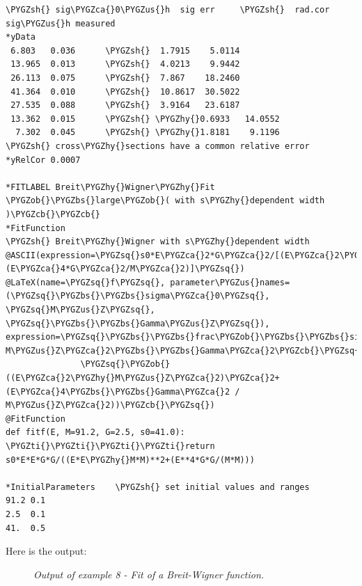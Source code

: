 \documentclass[a4paper,10pt,english]{sphinxmanual}
\def\PYGZbs{\char`\\}
\def\PYGZus{\char`\_}
\def\PYGZob{\char`\{}
\def\PYGZcb{\char`\}}
\def\PYGZca{\char`\^}
\def\PYGZsh{\char`\#}
\def\PYGZhy{\char`\-}
\def\PYGZsq{\char`\'}
\def\PYGZti{\char`\~}
\renewcommand\PYGZsq{\textquotesingle}
\begin{document}
\begin{Verbatim}[commandchars=\\\{\}]
\PYGZsh{} sig\PYGZca{}0\PYGZus{}h  sig err     \PYGZsh{}  rad.cor  sig\PYGZus{}h measured
*yData
 6.803   0.036      \PYGZsh{}  1.7915    5.0114
 13.965  0.013      \PYGZsh{}  4.0213    9.9442
 26.113  0.075      \PYGZsh{}  7.867    18.2460
 41.364  0.010      \PYGZsh{}  10.8617  30.5022
 27.535  0.088      \PYGZsh{}  3.9164   23.6187
 13.362  0.015      \PYGZsh{} \PYGZhy{}0.6933   14.0552
  7.302  0.045      \PYGZsh{} \PYGZhy{}1.8181    9.1196
\PYGZsh{} cross\PYGZhy{}sections have a common relative error
*yRelCor 0.0007

*FITLABEL Breit\PYGZhy{}Wigner\PYGZhy{}Fit \PYGZob{}\PYGZbs{}large\PYGZob{}( with s\PYGZhy{}dependent width )\PYGZcb{}\PYGZcb{}
*FitFunction
\PYGZsh{} Breit\PYGZhy{}Wigner with s\PYGZhy{}dependent width
@ASCII(expression=\PYGZsq{}s0*E\PYGZca{}2*G\PYGZca{}2/[(E\PYGZca{}2\PYGZhy{}M\PYGZca{}2)\PYGZca{}2+(E\PYGZca{}4*G\PYGZca{}2/M\PYGZca{}2)]\PYGZsq{})
@LaTeX(name=\PYGZsq{}f\PYGZsq{}, parameter\PYGZus{}names=(\PYGZsq{}\PYGZbs{}\PYGZbs{}sigma\PYGZca{}0\PYGZsq{}, \PYGZsq{}M\PYGZus{}Z\PYGZsq{}, \PYGZsq{}\PYGZbs{}\PYGZbs{}Gamma\PYGZus{}Z\PYGZsq{}),
expression=\PYGZsq{}\PYGZbs{}\PYGZbs{}frac\PYGZob{}\PYGZbs{}\PYGZbs{}sigma\PYGZca{}0\PYGZbs{}\PYGZbs{}, M\PYGZus{}Z\PYGZca{}2\PYGZbs{}\PYGZbs{}Gamma\PYGZca{}2\PYGZcb{}\PYGZsq{}
               \PYGZsq{}\PYGZob{}((E\PYGZca{}2\PYGZhy{}M\PYGZus{}Z\PYGZca{}2)\PYGZca{}2+(E\PYGZca{}4\PYGZbs{}\PYGZbs{}Gamma\PYGZca{}2 / M\PYGZus{}Z\PYGZca{}2))\PYGZcb{}\PYGZsq{})
@FitFunction
def fitf(E, M=91.2, G=2.5, s0=41.0):
\PYGZti{}\PYGZti{}\PYGZti{}\PYGZti{}return s0*E*E*G*G/((E*E\PYGZhy{}M*M)**2+(E**4*G*G/(M*M)))

*InitialParameters    \PYGZsh{} set initial values and ranges
91.2 0.1
2.5  0.1
41.  0.5
\end{Verbatim}

Here is the output:
\begin{figure}[htbp]
\centering
\capstart

\caption{\emph{Output of example 8 - Fit of a Breit-Wigner function.}}\end{figure}
\end{document}
